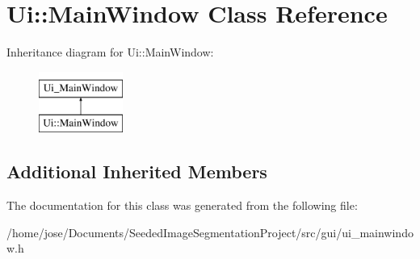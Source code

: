 \hypertarget{classUi_1_1MainWindow}{\section{Ui\-:\-:Main\-Window Class Reference}
\label{classUi_1_1MainWindow}
}
Inheritance diagram for Ui\-:\-:Main\-Window\-:\begin{figure}[H]
\begin{center}
\leavevmode
\includegraphics[height=2.000000cm]{classUi_1_1MainWindow}
\end{center}
\end{figure}
\subsection*{Additional Inherited Members}


The documentation for this class was generated from the following file\-:\begin{DoxyCompactItemize}
\item 
/home/jose/\-Documents/\-Seeded\-Image\-Segmentation\-Project/src/gui/ui\-\_\-mainwindow.\-h\end{DoxyCompactItemize}
